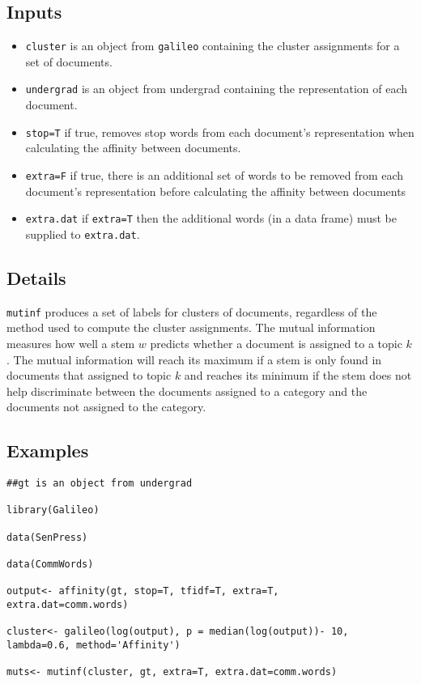 \documentclass[12pt,letterpaper]{article}
\begin{document}
\subsection*{Inputs}
\begin{itemize}
\item{{\tt cluster}} is an object from {\tt galileo} containing the cluster
assignments for a set of documents.
\item{{\tt undergrad}} is an object from undergrad containing the representation
of each document.
\item{{\tt stop=T}} if true, removes stop words from each document's
representation when calculating the affinity between documents.
\item{{\tt extra=F}} if true, there is an additional set of words to
be removed from each document's representation before calculating
the affinity between documents
\item{{\tt extra.dat}} if {\tt extra=T} then the additional words
(in a data frame) must be supplied to {\tt extra.dat}.
\end{itemize}

\subsection*{Details} {\tt mutinf} produces a set of labels for
clusters of documents, regardless of the method used to compute the
cluster assignments. The mutual information measures how well a stem
$w$ predicts whether a document is assigned to a topic $k$.  The
mutual information will reach its maximum if a stem is only found in
documents that assigned to topic $k$ and reaches its minimum if the
stem does not help discriminate between the documents assigned to a
category and the documents not assigned to the category.



\subsection*{Examples}
\begin{verbatim}
##gt is an object from undergrad

library(Galileo)

data(SenPress)

data(CommWords)

output<- affinity(gt, stop=T, tfidf=T, extra=T,
extra.dat=comm.words)

cluster<- galileo(log(output), p = median(log(output))- 10,
lambda=0.6, method='Affinity')

muts<- mutinf(cluster, gt, extra=T, extra.dat=comm.words)


\end{verbatim}
\end{document}
